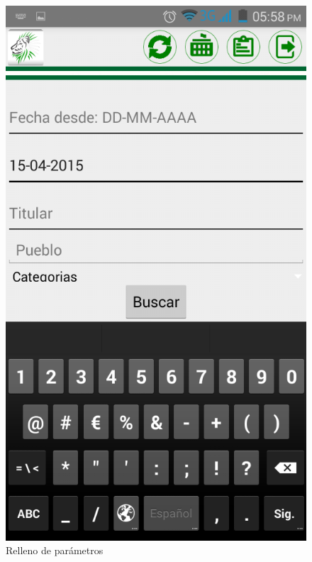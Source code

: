 \begin{figure}
\centering
\includegraphics[scale=0.5]{./android/imagenes/bus2.png}
\caption{Relleno de parámetros}
\label{bus2}
\end{figure}

